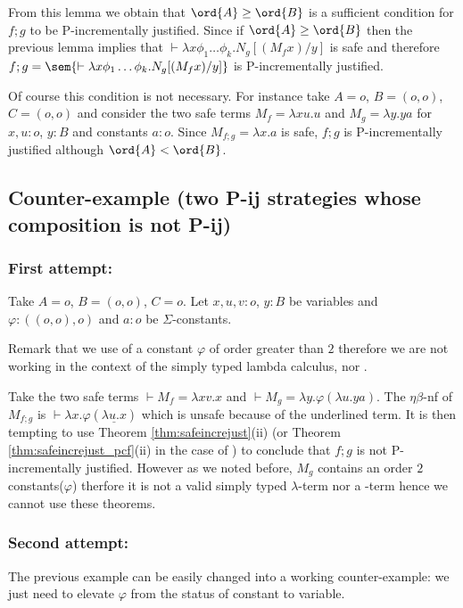 From this lemma we obtain that $\ord{A}\geq\ord{B}$ is
a sufficient condition for $f;g$ to be P-incrementally justified.
Since if $\ord{A}\geq\ord{B}$ then the previous lemma implies that $\vdash \lambda x \phi_1 \dots \phi_k. N_g [(M_f x) / y]$
is safe and therefore $f;g = \sem{\vdash \lambda x \phi_1 \dots \phi_k. N_g [(M_f x) / y]}$ is P-incrementally justified.


Of course this condition is not necessary. For instance take $A=o$, $B=(o,o)$, $C=(o,o)$ and consider the two safe terms $M_f = \lambda x u.u$ and $M_g = \lambda y . y a$ for $x,u:o$, $y:B$ and constants $a:o$. Since $M_{f;g} = \lambda x . a$ is safe, $f;g$ is P-incrementally justified although $\ord{A} < \ord{B}$.





\subsection{Counter-example (two P-ij strategies whose composition is not P-ij)}
\subsubsection{First attempt:}

Take $A=o$, $B=(o,o)$, $C=o$. Let $x,u,v:o$, $y:B$ be variables and $\varphi:((o,o),o)$ and $a:o$ be $\Sigma$-constants.

Remark that we use of a constant $\varphi$ of order greater than $2$ therefore we are not working in the context of the simply typed lambda calculus, nor \pcf.

Take the two safe terms $\vdash  M_f = \lambda xv.x$ and $\vdash M_g = \lambda y . \varphi (\lambda u . y a)$.
The $\eta\beta$-nf of $M_{f;g}$ is $\vdash \lambda x . \varphi (\underline{\lambda u . x})$ which is unsafe because of the underlined term. It is then tempting to use
Theorem \ref{thm:safeincrejust}(ii) (or Theorem \ref{thm:safeincrejust_pcf}(ii) in the case of \pcf) to conclude that
$f;g$ is not P-incrementally justified. However as we noted before, $M_g$ contains an order $2$ constants($\varphi$) therfore it is not a valid simply typed $\lambda$-term nor a \pcf-term hence we cannot use these theorems.

\subsubsection{Second attempt:}
The previous example can be easily changed into a working counter-example: we just need to elevate $\varphi$ from the status of constant to variable.

